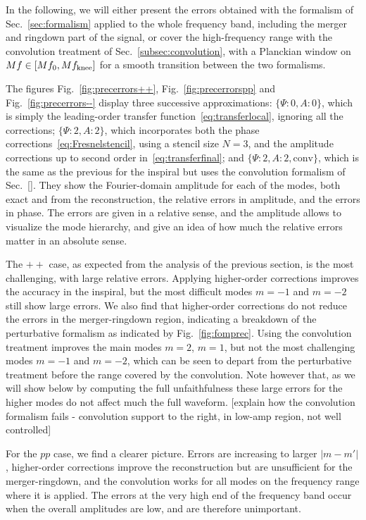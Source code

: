 \documentclass[aps,showpacs,twocolumn,
prd,superscriptaddress,nofootinbib]{revtex4-1}
\newcommand{\SM}[1]{{\color{Red} #1}}
\begin{document}
In the following, we will either present the errors obtained with the formalism of Sec.~\ref{sec:formalism} applied to the whole frequency band, including the merger and ringdown part of the signal, or cover the high-frequency range with the convolution treatment of Sec.~\ref{subsec:convolution}, with a Planckian window on $Mf\in [Mf_{0}, Mf_{\rm knee}]$ for a smooth transition between the two formalisms.

The figures Fig.~\ref{fig:precerrors++}, Fig.~\ref{fig:precerrorspp} and Fig.~\ref{fig:precerrors--} display three successive approximations: $\{\Psi:0,A:0\}$, which is simply the leading-order transfer function~\eqref{eq:transferlocal}, ignoring all the corrections; $\{\Psi:2,A:2\}$, which incorporates both the phase corrections~\eqref{eq:Fresnelstencil}, using a stencil size $N=3$, and the amplitude corrections up to second order in~\eqref{eq:transferfinal}; and $\{\Psi:2,A:2,\text{conv}\}$, which is the same as the previous for the inspiral but uses the convolution formalism of Sec.~\ref{}. They show the Fourier-domain amplitude for each of the modes, both exact and from the reconstruction, the relative errors in amplitude, and the errors in phase. The errors are given in a relative sense, and the amplitude allows to visualize the mode hierarchy, and give an idea of how much the relative errors matter in an absolute sense.

The $++$ case, as expected from the analysis of the previous section, is the most challenging, with large relative errors. Applying higher-order corrections improves the accuracy in the inspiral, but the most difficult modes $m=-1$ and $m=-2$ still show large errors. We also find that higher-order corrections do not reduce the errors in the merger-ringdown region, indicating a breakdown of the perturbative formalism as indicated by Fig.~\ref{fig:fomprec}. Using the convolution treatment improves the main modes $m=2$, $m=1$, but not the most challenging modes $m=-1$ and $m=-2$, which can be seen to depart from the perturbative treatment before the range covered by the convolution. Note however that, as we will show below by computing the full unfaithfulness these large errors for the higher modes do not affect much the full waveform.
\SM{[explain how the convolution formalism fails - convolution support to the right, in low-amp region, not well controlled]}

For the $pp$ case, we find a clearer picture. Errors are increasing to larger $|m-m'|$, higher-order corrections improve the reconstruction but are unsufficient for the merger-ringdown, and the convolution works for all modes on the frequency range where it is applied. The errors at the very high end of the frequency band occur when the overall amplitudes are low, and are therefore unimportant. 
\end{document}
